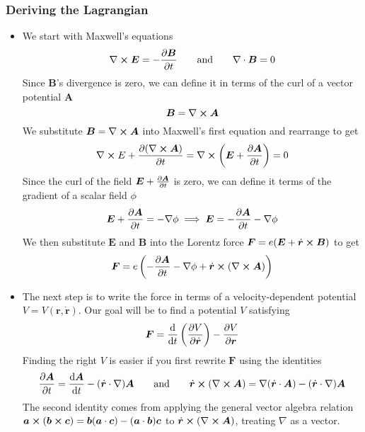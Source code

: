 \documentclass[11pt, a4paper]{article}
\newcommand{\eqtext}[1]{\qquad \text{#1} \qquad}
\newcommand{\bdot}[1]{\dot{\bm{#1}}}
\renewcommand{\curl}{\nabla \cross }
\renewcommand{\div}{\nabla \cdot }
\renewcommand{\grad}{\nabla }
\begin{document}
\subsubsection{Deriving the Lagrangian}
\begin{itemize}
	\item We start with Maxwell's equations
	\begin{equation*}
		\curl \bm{E} = -\pdv{\bm{B}}{t} \eqtext{and} \div \bm{B} = 0
	\end{equation*}
	Since $ \bm{B} $'s divergence is zero, we can define it in terms of the curl of a vector potential $ \bm{A} $
	\begin{equation*}
		\bm{B} = \curl \bm{A}
	\end{equation*}
	We substitute $ \bm{B} = \curl \bm{A}$ into Maxwell's first equation and rearrange to get
	\begin{equation*}
		\curl{E} + \pdv{(\curl \bm{A})}{t} = \curl \left(\bm{E} + \pdv{\bm{A}}{t}\right) = 0
	\end{equation*}
	Since the curl of the field $ \bm{E} + \pdv{\bm{A}}{t} $ is zero, we can define it terms of the gradient of a scalar field $ \phi $
	\begin{equation*}
		\bm{E} + \pdv{\bm{A}}{t} = - \grad{\phi} \implies \bm{E} = - \pdv{\bm{A}}{t} - \grad{\phi}
	\end{equation*}
	We then substitute $ \bm{E} $ and $ \bm{B} $ into the Lorentz force $ \bm{F} = e(\bm{E} + \bdot{r}\cross \bm{B}) $ to get
	\begin{equation*}
		\bm{F} = e \left(- \pdv{\bm{A}}{t} - \grad{\phi} + \bdot{r}\cross (\curl \bm{A}) \right)
	\end{equation*}
	
	\item The next step is to write the force in terms of a velocity-dependent potential $ V = V(\bm{r}, \bdot{r}) $. Our goal will be to find a potential $ V $ satisfying
	\begin{equation*}
		\bm{F} = \dv{}{t}\left(\pdv{V}{\bdot{r}}\right) - \pdv{V}{\bm{r}} 
	\end{equation*}	
	Finding the right $ V $ is easier if you first rewrite $ \bm{F} $ using the identities
	\begin{equation*}
		\pdv{\bm{A}}{t} = \dv{\bm{A}}{t} - (\bdot{r} \cdot \grad)\bm{A} \eqtext{and}  \bdot{r}\cross (\curl \bm{A}) = \grad(\bdot{r}\cdot\bm{A}) - (\bdot{r} \cdot \grad )\bm{A}
	\end{equation*}
	The second identity comes from applying the general vector algebra relation $ \bm{a} \cross (\bm{b} \cross \bm{c}) = \bm{b} (\bm{a}\cdot \bm{c}) - (\bm{a} \cdot \bm{b}) \bm{c}$ to $ \bdot{r} \cross (\curl \bm{A}) $, treating $ \grad $ as a vector.
		

\end{itemize}
\end{document}
